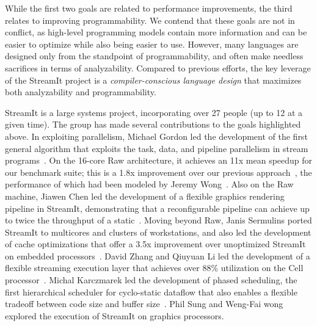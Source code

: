 While the first two goals are related to performance improvements, the
third relates to improving programmability.  We contend that these
goals are not in conflict, as high-level programming models contain
more information and can be easier to optimize while also being easier
to use.  However, many languages are designed only from the standpoint
of programmability, and often make needless sacrifices in terms of
analyzability.  Compared to previous efforts, the key leverage of the
StreamIt project is a {\it compiler-conscious language design} that
maximizes both analyzability and programmability.


StreamIt is a large systems project, incorporating over 27 people (up
to 12 at a given time).  The group has made several contributions to
the goals highlighted above.  In exploiting parallelism, Michael
Gordon led the development of the first general algorithm that
exploits the task, data, and pipeline parallelism in stream
programs~\cite{gordon-asplos06}.  On the 16-core Raw architecture, it
achieves an 11x mean speedup for our benchmark suite; this is a 1.8x
improvement over our previous
approach~\cite{gordon-asplos02,gordon-thesis}, the performance of
which had been modeled by Jeremy Wong~\cite{wong-thesis}.  Also on the
Raw machine, Jiawen Chen led the development of a flexible graphics
rendering pipeline in StreamIt, demonstrating that a reconfigurable
pipeline can achieve up to twice the throughput of a
static~\cite{chen-graphics05,chen_load-balanced_2005}.  Moving beyond
Raw, Janis Sermulins ported StreamIt to multicores and clusters of
workstations, and also led the development of cache optimizations that
offer a 3.5x improvement over unoptimized StreamIt on embedded
processors~\cite{sermulins-lctes05,sermulins-thesis}.  David Zhang and
Qiuyuan Li led the development of a flexible streaming execution layer
that achieves over 88\% utilization on the Cell
processor~\cite{zhang_lightweight_2007,zhang-thesis}.  Michal
Karczmarek led the development of phased scheduling, the first
hierarchical scheduler for cyclo-static dataflow that also enables a
flexible tradeoff between code size and buffer
size~\cite{karczmarek-lctes03,karczmarek-thesis}.  Phil Sung and
Weng-Fai wong explored the execution of StreamIt on graphics
processors.

